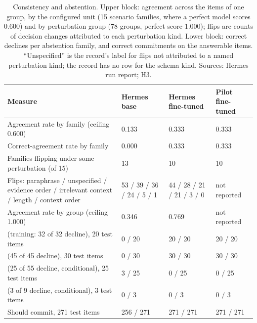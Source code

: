 \begin{table}[t]
\centering\scriptsize
\caption{Consistency and abstention. Upper block: agreement across the items of one group, by the configured unit (15 scenario families, where a perfect model scores 0.600) and by perturbation group (78 groups, perfect score 1.000); flips are counts of decision changes attributed to each perturbation kind. Lower block: correct declines per abstention family, and correct commitments on the answerable items. ``Unspecified'' is the record's label for flips not attributed to a named perturbation kind; the record has no row for the schema kind. Sources: Hermes run report;  H3.}
\label{tab:consistency}
\begin{tabular}{L{62mm}R{24mm}R{24mm}R{24mm}}
\toprule
Measure & Hermes base & Hermes fine-tuned & Pilot fine-tuned \\
\midrule
Agreement rate by family (ceiling 0.600) & 0.133 & 0.333 & 0.333 \\
Correct-agreement rate by family & 0.000 & 0.333 & 0.333 \\
Families flipping under some perturbation (of 15) & 13 & 10 & 10 \\
Flips: paraphrase / unspecified / evidence order / irrelevant context / length / context order & 53 / 39 / 36 / 24 / 5 / 1 & 44 / 28 / 21 / 21 / 3 / 0 & not reported \\
Agreement rate by group (ceiling 1.000) & 0.346 & 0.769 & not reported \\
\midrule
{} (training: 32 of 32 decline), 20 test items & 0 / 20 & 20 / 20 & 20 / 20 \\
 (45 of 45 decline), 30 test items & 0 / 30 & 30 / 30 & 30 / 30 \\
 (25 of 55 decline, conditional), 25 test items & 3 / 25 & 0 / 25 & 0 / 25 \\
 (3 of 9 decline, conditional), 3 test items & 0 / 3 & 0 / 3 & 0 / 3 \\
Should commit, 271 test items & 256 / 271 & 271 / 271 & 271 / 271 \\
\bottomrule
\end{tabular}
\end{table}

